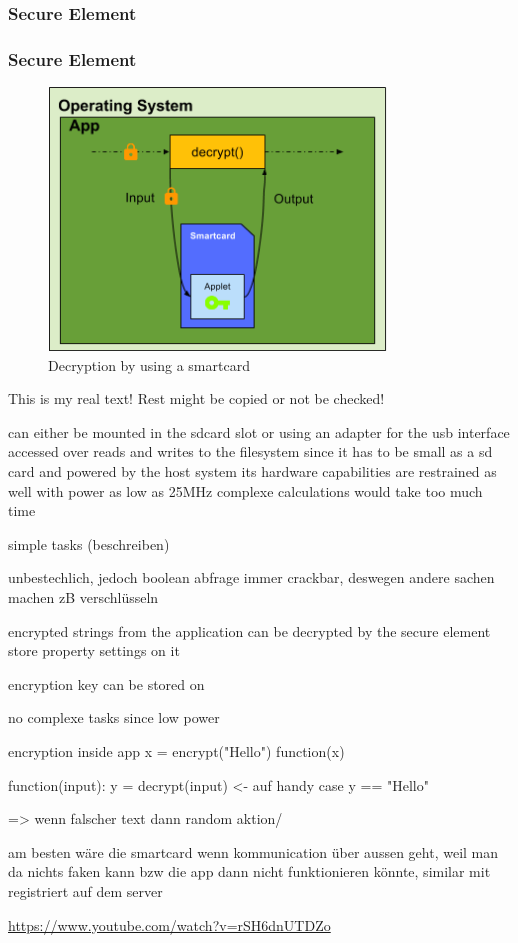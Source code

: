 \subsubsection{Secure Element} \label{subsection:counter-replace-encryption-key-local}
\subsubsection{Secure Element} \label{subsection:counter-replace-encryption-key-online}
\begin{figure}[h]
    \centering
    \includegraphics[width=0.8\textwidth]{data/encryptionKeySmart.png}
    \caption{Decryption by using a smartcard}
    \label{fig:encryptionKeySmart}
\end{figure}

This is my real text! Rest might be copied or not be checked!

can either be mounted in the sdcard slot or using an adapter for the usb interface
accessed over reads and writes to the filesystem
since it has to be small as a sd card and powered by the host system its hardware capabilities are restrained as well \cite{stSe} with power as low as 25MHz complexe calculations would take too much time

simple tasks (beschreiben)

unbestechlich, jedoch boolean abfrage immer crackbar, deswegen andere sachen machen zB verschlüsseln

encrypted strings from the application can be decrypted by the secure element
store property settings on it

encryption key can be stored on

no complexe tasks since low power


encryption inside app
x = encrypt("Hello")
function(x)

function(input):
y = decrypt(input) <- auf handy
case y == "Hello"

=> wenn falscher text dann random aktion/


am besten wäre die smartcard wenn kommunication über aussen geht, weil man da nichts faken kann bzw die app dann nicht funktionieren könnte, similar mit registriert auf dem server

\url{https://www.youtube.com/watch?v=rSH6dnUTDZo}
